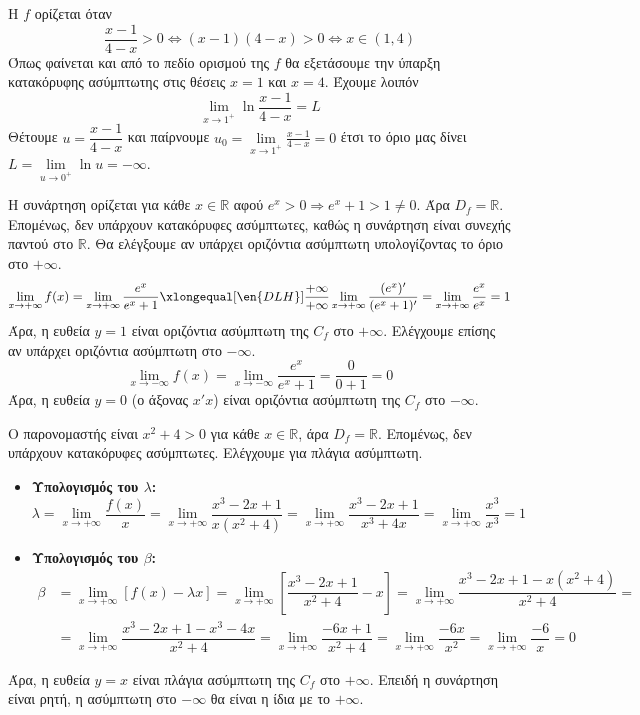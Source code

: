 \lysh\vspace{-5mm}
\begin{alist}
\item Η $f$ ορίζεται όταν
\[\frac{x-1}{4-x}>0\Leftrightarrow(x-1)(4-x)>0\Leftrightarrow x\in(1,4)\]
Όπως φαίνεται και από το πεδίο ορισμού της $f$ θα εξετάσουμε την ύπαρξη κατακόρυφης ασύμπτωτης στις θέσεις $x=1$ και $x=4$. Έχουμε λοιπόν
\[
\lim\limits_{x\to 1^+}{\ln{\frac{x-1}{4-x}}}=L
\]
Θέτουμε $u=\dfrac{x-1}{4-x}$ και παίρνουμε $u_0=\lim\limits_{x\to 1^+}{\frac{x-1}{4-x}}=0 $ έτσι το όριο μας δίνει $L=\lim\limits_{u\to 0^+}{\ln{u}}=-\infty$.
\item Η συνάρτηση ορίζεται για κάθε $x \in \mathbb{R}$ αφού $e^x > 0 \Rightarrow e^x + 1 > 1 \neq 0$. Άρα $D_f = \mathbb{R}$. Επομένως, {δεν υπάρχουν κατακόρυφες ασύμπτωτες}, καθώς η συνάρτηση είναι συνεχής παντού στο $\mathbb{R}$. Θα ελέγξουμε αν υπάρχει οριζόντια ασύμπτωτη υπολογίζοντας το όριο στο $+\infty$.
\[ \lim\limits_{x\to +\infty} f(x) = \lim\limits_{x\to +\infty} \dfrac{e^x}{e^x+1} \xlongequal[\en{DLH}]{\frac{+\infty}{+\infty}} \lim\limits_{x\to +\infty} \dfrac{(e^x)'}{(e^x+1)'} = \lim\limits_{x\to +\infty} \dfrac{e^x}{e^x} = 1 \]
Άρα, η ευθεία {$y=1$ είναι οριζόντια ασύμπτωτη} της $C_f$ στο $+\infty$.
Ελέγχουμε επίσης αν υπάρχει οριζόντια ασύμπτωτη στο $-\infty$. 
\[ \lim\limits_{x\to -\infty} f(x) = \lim\limits_{x\to -\infty} \dfrac{e^x}{e^x+1} = \dfrac{0}{0+1} = 0 \]
Άρα, η ευθεία {$y=0$ (ο άξονας $x'x$) είναι οριζόντια ασύμπτωτη} της $C_f$ στο $-\infty$.
\item 
Ο παρονομαστής είναι $x^2+4 > 0$ για κάθε $x \in \mathbb{R}$, άρα $D_f = \mathbb{R}$. Επομένως, {δεν υπάρχουν κατακόρυφες ασύμπτωτες}. Ελέγχουμε για πλάγια ασύμπτωτη.
\begin{itemize}
    \item \textbf{Υπολογισμός του $\lambda$:}
    \[ \lambda = \lim\limits_{x\to +\infty} \dfrac{f(x)}{x} = \lim\limits_{x\to +\infty} \dfrac{x^3-2x+1}{x(x^2+4)} = \lim\limits_{x\to +\infty} \dfrac{x^3-2x+1}{x^3+4x} = \lim\limits_{x\to +\infty} \dfrac{x^3}{x^3} = 1 \]
    \item \textbf{Υπολογισμός του $\beta$:}
\begin{align*}
     \beta &= \lim\limits_{x\to +\infty} [f(x) - \lambda x] = \lim\limits_{x\to +\infty} \left[ \dfrac{x^3-2x+1}{x^2+4} - x \right] = \lim\limits_{x\to +\infty} \dfrac{x^3-2x+1 - x(x^2+4)}{x^2+4} =\\&= \lim\limits_{x\to +\infty} \dfrac{x^3-2x+1 - x^3-4x}{x^2+4} 
 = \lim\limits_{x\to +\infty} \dfrac{-6x+1}{x^2+4} = \lim\limits_{x\to +\infty} \dfrac{-6x}{x^2} = \lim\limits_{x\to +\infty} \dfrac{-6}{x} = 0
\end{align*}

\end{itemize}
Άρα, η ευθεία {$y = x$ είναι πλάγια ασύμπτωτη} της $C_f$ στο $+\infty$. Επειδή η συνάρτηση είναι ρητή, η ασύμπτωτη στο $-\infty$ θα είναι η ίδια με το $+\infty$.
\end{alist}

